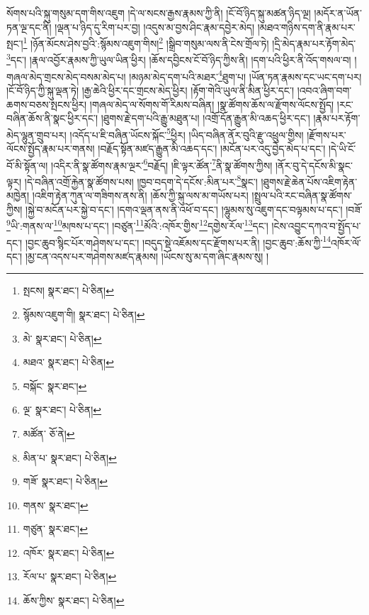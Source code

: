 སོགས་པའི་སྐུ་གསུམ་དག་གིས་འཇུག །དེ་ལ་སངས་རྒྱས་རྣམས་ཀྱི་ནི། །ངོ་བོ་ཉིད་སྐུ་མཚན་ཉིད་ལྔ། །མདོར་ན་ཡོན་ཏན་ལྔ་དང་ནི། །ལྡན་པ་ཉིད་དུ་རིག་པར་བྱ། །འདུས་མ་བྱས་ཤིང་རྣམ་དབྱེར་མེད། །མཐའ་གཉིས་དག་ནི་རྣམ་པར་སྤང་།\footnote{སྤངས།  སྣར་ཐང་།  པེ་ཅིན། } །ཉོན་མོངས་ཤེས་བྱའི་:སྙོམས་འཇུག་གིས།\footnote{སྙོམས་འཇུག་གི།  སྣར་ཐང་།  པེ་ཅིན། } །སྒྲིབ་གསུམ་ལས་ནི་ངེས་གྲོལ་ཏེ། །དྲི་མེད་རྣམ་པར་རྟོག་མེད་\footnote{མེ་  སྣར་ཐང་།  པེ་ཅིན། }དང་། །རྣལ་འབྱོར་རྣམས་ཀྱི་ཡུལ་ཡིན་ཕྱིར། །ཆོས་དབྱིངས་ངོ་བོ་ཉིད་ཀྱིས་ནི། །དག་པའི་ཕྱིར་ནི་འོད་གསལ་བ། །གཞལ་མེད་གྲངས་མེད་བསམ་མེད་པ། །མཉམ་མེད་དག་པའི་མཐར་\footnote{མཐའ་  སྣར་ཐང་།  པེ་ཅིན། }ཐུག་པ། །ཡོན་ཏན་རྣམས་དང་ཡང་དག་པར། །ངོ་བོ་ཉིད་ཀྱི་སྐུ་ལྡན་ཏེ། །རྒྱ་ཆེའི་ཕྱིར་དང་གྲངས་མེད་ཕྱིར། །རྟོག་གེའི་ཡུལ་ནི་མིན་ཕྱིར་དང་། །འབའ་ཞིག་བག་ཆགས་བཅས་སྤངས་ཕྱིར། །གཞལ་མེད་ལ་སོགས་གོ་རིམས་བཞིན། །སྣ་ཚོགས་ཆོས་ལ་རྫོགས་ལོངས་སྤྱོད། །རང་བཞིན་ཆོས་ནི་སྣང་ཕྱིར་དང་། །ཐུགས་རྗེ་དག་པའི་རྒྱུ་མཐུན་པ། །འགྲོ་དོན་རྒྱུན་མི་འཆད་ཕྱིར་དང་། །རྣམ་པར་རྟོག་མེད་ལྷུན་གྲུབ་པར། །འདོད་པ་ཇི་བཞིན་ཡོངས་སྐོང་\footnote{བསྐོང་  སྣར་ཐང་། }ཕྱིར། །ཡིད་བཞིན་ནོར་བུའི་རྫུ་འཕྲུལ་གྱིས། །རྫོགས་པར་ལོངས་སྤྱོད་རྣམ་པར་གནས། །བརྗོད་སྟོན་མཛད་རྒྱུན་མི་འཆད་དང་། །མངོན་པར་འདུ་བྱེད་མེད་པ་དང་། །དེ་ཡི་ངོ་བོ་མི་སྟོན་ལ། །འདིར་ནི་སྣ་ཚོགས་རྣམ་ལྔར་\footnote{ལྔ་  སྣར་ཐང་།  པེ་ཅིན། }བརྗོད། །ཇི་ལྟར་ཚོན་\footnote{མཚོན་  ཅོ་ནེ། }ནི་སྣ་ཚོགས་ཀྱིས། །ནོར་བུ་དེ་དངོས་མི་སྣང་ལྟར། །དེ་བཞིན་འགྲོ་རྐྱེན་སྣ་ཚོགས་པས། །ཁྱབ་བདག་དེ་དངོས་:མིན་པར་\footnote{མིན་པ་  སྣར་ཐང་།  པེ་ཅིན། }སྣང་། །ཐུགས་རྗེ་ཆེན་པོས་འཇིག་རྟེན་མཁྱེན། །འཇིག་རྟེན་ཀུན་ལ་གཟིགས་ནས་ནི། །ཆོས་ཀྱི་སྐུ་ལས་མ་གཡོས་པར། །སྤྲུལ་པའི་རང་བཞིན་སྣ་ཚོགས་ཀྱིས། །སྐྱེ་བ་མངོན་པར་སྐྱེ་བ་དང་། །དགའ་ལྡན་ནས་ནི་འཕོ་བ་དང་། །ལྷུམས་སུ་འཇུག་དང་བལྟམས་པ་དང་། །བཟོ་\footnote{གཟོ་  སྣར་ཐང་།  པེ་ཅིན། }ཡི་:གནས་ལ་\footnote{གནས་  སྣར་ཐང་། }མཁས་པ་དང་། །བཙུན་\footnote{གཙུན་  སྣར་ཐང་། }མོའི་:འཁོར་གྱིས་\footnote{འཁོར་  སྣར་ཐང་།  པེ་ཅིན། }དགྱེས་རོལ་\footnote{རོལ་པ་  སྣར་ཐང་།  པེ་ཅིན། }དང་། །ངེས་འབྱུང་དཀའ་བ་སྤྱོད་པ་དང་། །བྱང་ཆུབ་སྙིང་པོར་གཤེགས་པ་དང་། །བདུད་སྡེ་འཇོམས་དང་རྫོགས་པར་ནི། །བྱང་ཆུབ་:ཆོས་ཀྱི་\footnote{ཆོས་ཀྱིས་  སྣར་ཐང་།  པེ་ཅིན། }འཁོར་ལོ་དང་། །མྱ་ངན་འདས་པར་གཤེགས་མཛད་རྣམས། །ཡོངས་སུ་མ་དག་ཞིང་རྣམས་སུ། །
